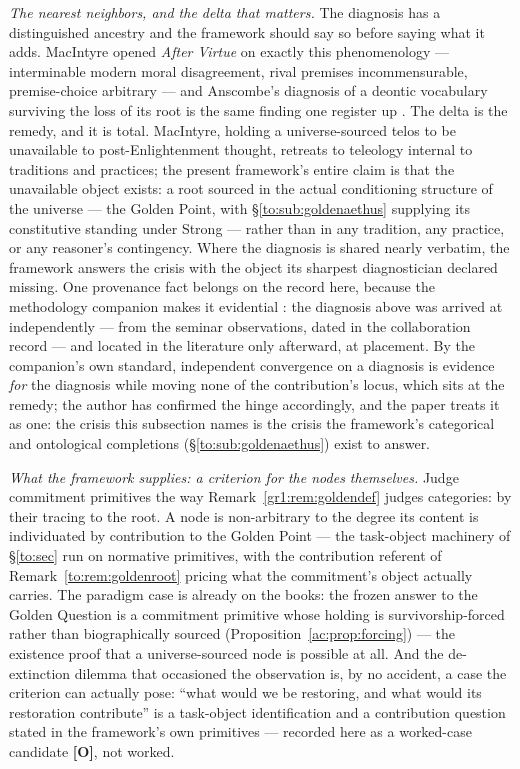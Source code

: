 \documentclass[11pt]{article}
\numberwithin{equation}{section}
\theoremstyle{plain}
\theoremstyle{definition}
\theoremstyle{remark}
\begin{document}
\emph{The nearest neighbors, and the delta that matters.} The
diagnosis has a distinguished ancestry and the framework should say so
before saying what it adds. MacIntyre opened \emph{After Virtue} on
exactly this phenomenology --- interminable modern moral disagreement,
rival premises incommensurable, premise-choice arbitrary --- and
Anscombe's diagnosis of a deontic vocabulary surviving the loss of its
root is the same finding one register up \cite{MacIntyre81,
Anscombe58}. The delta is the remedy, and it is total. MacIntyre,
holding a universe-sourced telos to be unavailable to
post-Enlightenment thought, retreats to teleology internal to
traditions and practices; the present framework's entire claim is that
the unavailable object exists: a root sourced in the actual
conditioning structure of the universe --- the Golden Point, with
\S\ref{to:sub:goldenaethus} supplying its constitutive standing under
Strong --- rather than in any tradition, any practice, or any
reasoner's contingency. Where the diagnosis is shared nearly verbatim,
the framework answers the crisis with the object its sharpest
diagnostician declared missing. One provenance fact belongs on the
record here, because the methodology companion makes it evidential
\cite{Ben26Method}: the diagnosis above was arrived at independently
--- from the seminar observations, dated in the collaboration record
--- and located in the literature only afterward, at placement. By the
companion's own standard, independent convergence on a diagnosis is
evidence \emph{for} the diagnosis while moving none of the
contribution's locus, which sits at the remedy; the author has
confirmed the hinge accordingly, and the paper treats it as one: the
crisis this subsection names is the crisis the framework's categorical
and ontological completions (\S\ref{to:sub:goldenaethus}) exist to
answer.

\emph{What the framework supplies: a criterion for the nodes
themselves.} Judge commitment primitives the way
Remark~\ref{gr1:rem:goldendef} judges categories: by their tracing to
the root. A node is non-arbitrary to the degree its content is
individuated by contribution to the Golden Point --- the task-object
machinery of \S\ref{to:sec} run on normative primitives, with the
contribution referent of Remark~\ref{to:rem:goldenroot} pricing what
the commitment's object actually carries. The paradigm case is
already on the books: the frozen answer to the Golden Question is a
commitment primitive whose holding is survivorship-forced rather than
biographically sourced (Proposition~\ref{ac:prop:forcing}) --- the
existence proof that a universe-sourced node is possible at all. And
the de-extinction dilemma that occasioned the observation is, by no
accident, a case the criterion can actually pose: ``what would we be
restoring, and what would its restoration contribute'' is a
task-object identification and a contribution question stated in the
framework's own primitives --- recorded here as a worked-case
candidate \textbf{[O]}, not worked.
\end{document}
